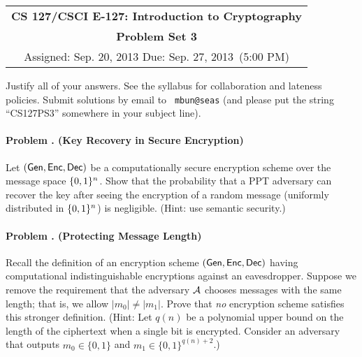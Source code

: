 \documentclass[11pt]{article}
\newcommand{\psnum}{3}
\newcommand{\assdate}{Sep. 20, 2013 \hspace{-5em}}
\newcommand{\duedate}{Sep. 27, 2013}
\newcounter{problem}
\newenvironment{problem}[1]{\stepcounter{problem}
\paragraph{Problem \theproblem. #1}}{}
\begin{document}
\begin{center}
\renewcommand{\arraystretch}{2}
\begin{tabular}{|c|}
\hline
{\large \bfseries CS 127/CSCI E-127: Introduction to Cryptography} \\

{\large \bfseries Problem Set \psnum}\\
Assigned: \assdate
\hspace{20em} Due: \duedate\ (5:00 PM)\\
\hline
\end{tabular}
\renewcommand{\arraystretch}{1}
\end{center}
\vspace{1cm}

\noindent Justify all of your answers.  See the syllabus for
collaboration and lateness policies. Submit solutions by email to {\tt
mbun@seas} (and please put the string ``CS127PS\psnum'' somewhere in your subject line).

\begin{problem}{(Key Recovery in Secure Encryption)}
Let $(\mathsf{Gen},\mathsf{Enc},\mathsf{Dec})$ be a computationally secure encryption scheme
over the message space $\{0,1\}^n$.  Show that the probability that a
PPT adversary can recover the key after seeing the encryption of a
random message (uniformly distributed in $\{0,1\}^n$) is negligible.
(Hint: use semantic security.)
\end{problem}

\begin{problem}{(Protecting Message Length)}
Recall the definition of an encryption scheme $(\mathsf{Gen}, \mathsf{Enc}, \mathsf{Dec})$ having computational indistinguishable encryptions against an eavesdropper. Suppose we remove the requirement that the adversary $\mathcal{A}$ chooses messages with the same length; that is, we allow $|m_0| \ne |m_1|$. Prove that \emph{no} encryption scheme satisfies this stronger definition. (Hint: Let $q(n)$ be a polynomial upper bound on the length of the ciphertext when a single bit is encrypted. Consider an adversary that outputs $m_0 \in \{0, 1\}$ and $m_1 \in \{0, 1\}^{q(n) + 2}$.)
\end{problem}
\end{document}
